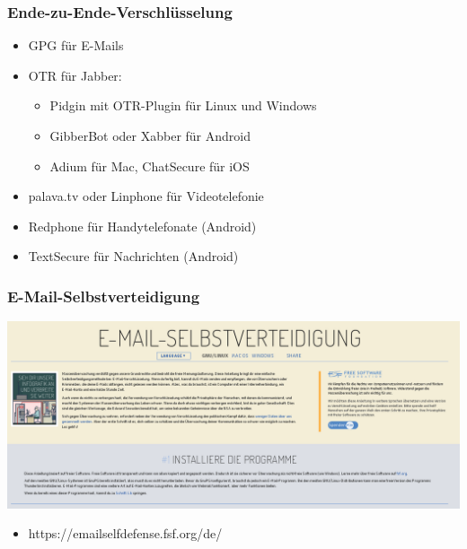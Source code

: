 \documentclass[12pt]{beamer}
\begin{document}
\begin{frame}
  \frametitle{Ende-zu-Ende-Verschlüsselung}
  \begin{itemize}
    \item<1-> GPG für E-Mails
    \item<2-> OTR für Jabber:
      \begin{itemize}
        \item Pidgin mit OTR-Plugin für Linux und Windows
        \item GibberBot oder Xabber für Android
        \item Adium für Mac, ChatSecure für iOS
      \end{itemize}
    \item<3-> palava.tv oder Linphone für Videotelefonie
    \item<4-> Redphone für Handytelefonate (Android)
    \item<5-> TextSecure für Nachrichten (Android)
  \end{itemize}
\end{frame}

\begin{frame}
  \frametitle{E-Mail-Selbstverteidigung}
  \begin{center}
    \includegraphics[height=0.5\textheight]{img/emailselfdefense.png}
    \begin{itemize}
      \item https://emailselfdefense.fsf.org/de/
    \end{itemize}	
  \end{center}	
\end{frame}
\end{document}
